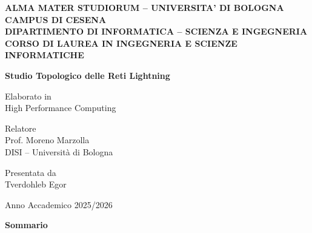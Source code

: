 \documentclass[12pt,a4paper,oneside]{book}
\begin{document}
\begin{titlepage}
\thispagestyle{empty}
\begin{center}

\vspace*{0.8cm}
{\large\bfseries ALMA MATER STUDIORUM -- UNIVERSITA' DI BOLOGNA}\\[0.5em]
{\large\bfseries CAMPUS DI CESENA}\\[2em]
{\large\bfseries DIPARTIMENTO DI INFORMATICA -- SCIENZA E INGEGNERIA}\\[1.5em]
{\large\bfseries CORSO DI LAUREA IN INGEGNERIA E SCIENZE INFORMATICHE}\\

\vspace{1.8cm}

{\large\bfseries Studio Topologico delle Reti Lightning}\\

\vspace{1.8cm}

Elaborato in\\[1.5em]
High Performance Computing\\

\end{center}

\vspace{1.5cm}

\noindent\hspace{0.05\textwidth}%
\begin{minipage}[t]{0.38\textwidth}
    Relatore\\[2.5em]
    Prof. Moreno Marzolla\\[0.4em]
    {\footnotesize DISI -- Università di Bologna}
\end{minipage}%
\hfill
\begin{minipage}[t]{0.38\textwidth}
    \raggedright
    Presentata da\\[2.5em]
    Tverdohleb Egor
\end{minipage}\hspace{0.05\textwidth}

\vfill

\begin{center}
    Anno Accademico 2025/2026
\end{center}

\end{titlepage}

\begin{center}
    \textbf{\large Sommario}
\end{center}
\vspace{1em}
\end{document}
